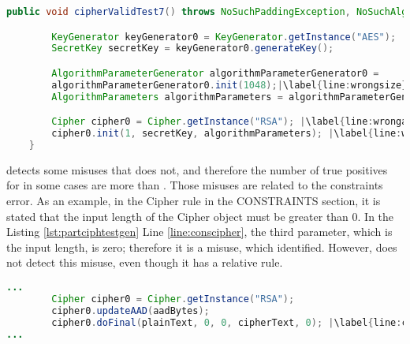 \begin{lstlisting}[language=Java, caption=One of the valid test cases for the Cipher API that \cognicrypttestgen{} generated from the original \crysl{} Bouncy Castle JCA ruleset., label={lst:ciphertestgen}, escapechar=|]
	public void cipherValidTest7() throws NoSuchPaddingException, NoSuchAlgorithmException, InvalidKeyException, InvalidAlgorithmParameterException {

		KeyGenerator keyGenerator0 = KeyGenerator.getInstance("AES");
		SecretKey secretKey = keyGenerator0.generateKey();

		AlgorithmParameterGenerator algorithmParameterGenerator0 =                   AlgorithmParameterGenerator.getInstance("AES");
		algorithmParameterGenerator0.init(1048);|\label{line:wrongsize}|
		AlgorithmParameters algorithmParameters = algorithmParameterGenerator0.generateParameters();

		Cipher cipher0 = Cipher.getInstance("RSA"); |\label{line:wrongalg}|
		cipher0.init(1, secretKey, algorithmParameters); |\label{line:wrongorder}|
	}
\end{lstlisting} 

\cognicryptsast{} detects some misuses that \codyze{} does not, and therefore the number of true positives for \cognicryptsast{} in some cases are more than \codyze. Those misuses are related to the constraints error. As an example, in the Cipher \crysl{} rule in the CONSTRAINTS section, it is stated that the input length of the Cipher object must be greater than 0. In the Listing \ref{lst:partciphtestgen} Line \ref{line:conscipher}, the third parameter, which is the input length, is zero; therefore it is a misuse, which \cognicryptsast{} identified. However, \codyze{} does not detect this misuse, even though it has a relative \MARK{} rule.

\begin{lstlisting}[language=Java, caption=Part of a test case for the Cipher API from the Bouncy Castle tests, label={lst:partciphtestgen}, escapechar=|]
...
		Cipher cipher0 = Cipher.getInstance("RSA");
		cipher0.updateAAD(aadBytes);
		cipher0.doFinal(plainText, 0, 0, cipherText, 0); |\label{line:conscipher}|
...
\end{lstlisting}

